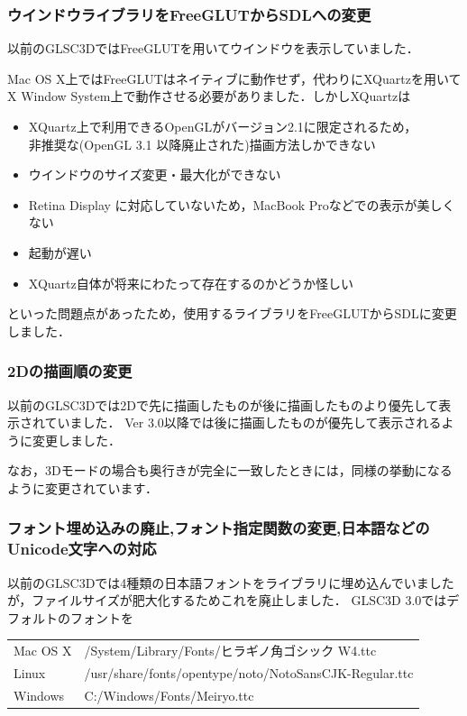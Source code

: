 \documentclass[a4paper,12pt]{jsarticle}%
\begin{document}
\subsubsection{ウインドウライブラリをFreeGLUTからSDLへの変更}
以前のGLSC3DではFreeGLUTを用いてウインドウを表示していました．

Mac OS X上ではFreeGLUTはネイティブに動作せず，代わりにXQuartzを用いてX Window System上で動作させる必要がありました．しかしXQuartzは
\begin{itemize}
	\item XQuartz上で利用できるOpenGLがバージョン2.1に限定されるため，\\非推奨な(OpenGL 3.1 以降廃止された)描画方法しかできない
	\item ウインドウのサイズ変更・最大化ができない
	\item Retina Display に対応していないため，MacBook Proなどでの表示が美しくない
	\item 起動が遅い
	\item XQuartz自体が将来にわたって存在するのかどうか怪しい
\end{itemize}
といった問題点があったため，使用するライブラリをFreeGLUTからSDLに変更しました．

\subsubsection{2Dの描画順の変更}
以前のGLSC3Dでは2Dで先に描画したものが後に描画したものより優先して表示されていました．
Ver 3.0以降では後に描画したものが優先して表示されるように変更しました．

なお，3Dモードの場合も奥行きが完全に一致したときには，同様の挙動になるように変更されています．

\subsubsection{フォント埋め込みの廃止,フォント指定関数の変更,日本語などのUnicode文字への対応}
以前のGLSC3Dでは4種類の日本語フォントをライブラリに埋め込んでいましたが，ファイルサイズが肥大化するためこれを廃止しました．
GLSC3D 3.0ではデフォルトのフォントを
\begin{table}[h]
	\centering
	\begin{tabular}{ll}
		Mac OS X & /System/Library/Fonts/ヒラギノ角ゴシック W4.ttc\\
		Linux & /usr/share/fonts/opentype/noto/NotoSansCJK-Regular.ttc\\
		Windows & C:/Windows/Fonts/Meiryo.ttc\\
	\end{tabular}
\end{table}
\end{document}

